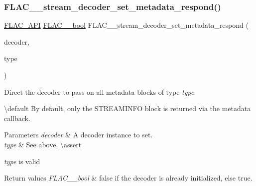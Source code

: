 \subsubsection{\texorpdfstring{FLAC\_\_stream\_decoder\_set\_metadata\_respond()}{FLAC\_\_stream\_decoder\_set\_metadata\_respond()}}
{\footnotesize\ttfamily \mbox{\hyperlink{group__flac__export_ga56ca07df8a23310707732b1c0007d6f5}{F\+L\+A\+C\+\_\+\+A\+PI}} \mbox{\hyperlink{ordinals_8h_a95103469f1cbd78b8cf250194985b34e}{F\+L\+A\+C\+\_\+\+\_\+bool}} F\+L\+A\+C\+\_\+\+\_\+stream\+\_\+decoder\+\_\+set\+\_\+metadata\+\_\+respond (\begin{DoxyParamCaption}\item[{\mbox{\hyperlink{struct_f_l_a_c_____stream_decoder}{F\+L\+A\+C\+\_\+\+\_\+\+Stream\+Decoder}} $\ast$}]{decoder,  }\item[{\mbox{\hyperlink{group__flac__format_gac71714ba8ddbbd66d26bb78a427fac01}{F\+L\+A\+C\+\_\+\+\_\+\+Metadata\+Type}}}]{type }\end{DoxyParamCaption})}

Direct the decoder to pass on all metadata blocks of type {\itshape type}.

\textbackslash{}default By default, only the {\ttfamily S\+T\+R\+E\+A\+M\+I\+N\+FO} block is returned via the metadata callback. 
\begin{DoxyParams}{Parameters}
{\em decoder} & A decoder instance to set. \\
\hline
{\em type} & See above. \textbackslash{}assert 
\begin{DoxyCode}{1}
\end{DoxyCode}
 {\itshape type} is valid \\
\hline
\end{DoxyParams}

\begin{DoxyRetVals}{Return values}
{\em F\+L\+A\+C\+\_\+\+\_\+bool} & {\ttfamily false} if the decoder is already initialized, else {\ttfamily true}. \\
\hline
\end{DoxyRetVals}
\mbox{\label{group__flac__stream__decoder_gaf3bec52172d727a4db8209b82db00c84}} 
